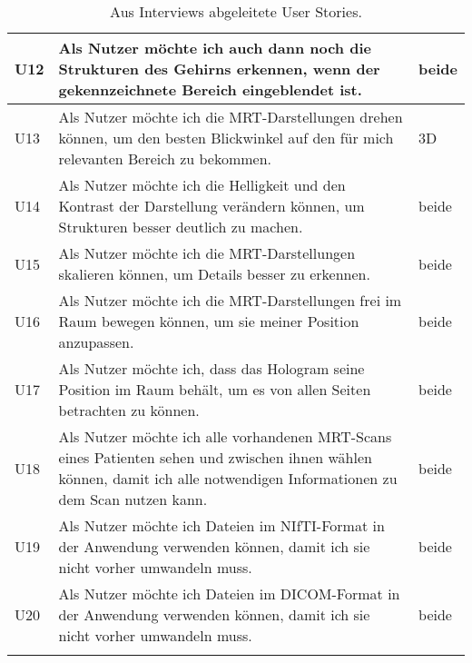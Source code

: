 \begin{longtable}{p{}p{}p{}}
\midrule
U12 & Als Nutzer möchte ich auch dann noch die Strukturen des Gehirns erkennen, wenn der gekennzeichnete Bereich eingeblendet ist. & beide\\
\midrule 
U13 & Als Nutzer möchte ich die MRT-Darstellungen drehen können, um den besten Blickwinkel auf den für mich relevanten Bereich zu bekommen. & 3D\\
\midrule 
U14 & Als Nutzer möchte ich die Helligkeit und den Kontrast der Darstellung verändern können, um Strukturen besser deutlich zu machen. & beide\\
\midrule 
U15 & Als Nutzer möchte ich die MRT-Darstellungen skalieren können, um Details besser zu erkennen. & beide\\
\midrule 
U16 & Als Nutzer möchte ich die MRT-Darstellungen frei im Raum bewegen können, um sie meiner Position anzupassen. & beide\\
\midrule 
U17 & Als Nutzer möchte ich, dass das Hologram seine Position im Raum behält, um es von allen Seiten betrachten zu können. & beide\\
\midrule 
U18 & Als Nutzer möchte ich alle vorhandenen MRT-Scans eines Patienten sehen und zwischen ihnen wählen können, damit ich alle notwendigen Informationen zu dem Scan nutzen kann. & beide \\
\midrule 
U19 & Als Nutzer möchte ich Dateien im NIfTI-Format in der Anwendung verwenden können, damit ich sie nicht vorher umwandeln muss. & beide\\
\midrule 
U20 & Als Nutzer möchte ich Dateien im DICOM-Format in der Anwendung verwenden können, damit ich sie nicht vorher umwandeln muss. & beide\\

\bottomrule
\caption{\label{tab:userStories}Aus Interviews abgeleitete User Stories.}
\end{longtable}


